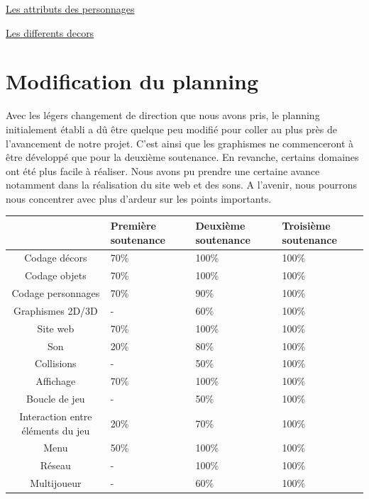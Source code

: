 \documentclass{article}
\begin{document}
\par
\underline{Les attributs des personnages}
\newline

\par

\underline{Les differents decors}
\newline

\newpage

\section{Modification du planning}

Avec les légers changement de direction que nous avons pris, le planning initialement établi a dû être quelque peu modifié pour coller au plus près de l'avancement de notre projet. C'est ainsi que les graphismes ne commenceront à être développé que pour la deuxième soutenance. En revanche, certains domaines ont été plus facile à réaliser. Nous avons pu prendre une certaine avance notamment dans la réalisation du site web et des sons. A l'avenir, nous pourrons nous concentrer avec plus d'ardeur sur les points importants.
\begin{center}
\begin{tabular}{|c|p{2cm}|p{2cm}|p{2cm}|}


\hline
   & Première soutenance & Deuxième soutenance & Troisième soutenance\\ 
\hline

Codage décors & 70\% & 100\% & 100\%\\
\hline
Codage objets & 70\% & 100\% & 100\%\\
\hline
Codage personnages & 70\% & 90\% & 100\%\\
\hline

Graphismes 2D/3D & - & 60\% & 100\%\\
\hline

Site web & 70\% & 100\% & 100\%\\
\hline

Son & 20\% & 80\% & 100\%\\
\hline

Collisions & - & 50\% & 100\%\\
\hline

Affichage & 70\% & 100\% & 100\%\\
\hline

Boucle de jeu & - & 50\% & 100\%\\
\hline

Interaction entre éléments du jeu & 20\% & 70\% & 100\%\\
\hline

Menu & 50\% & 100\% & 100\%\\
\hline

Réseau & - & 100\% & 100\%\\
\hline

Multijoueur & - & 60\% & 100\%\\
\hline

\end{tabular}
\end{center}
\end{document}
